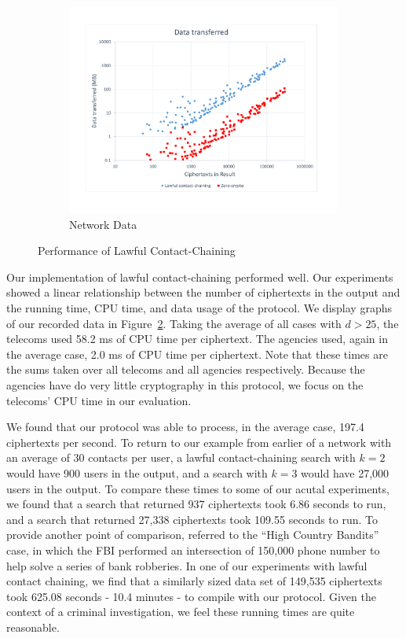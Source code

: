 \begin{figure}[t]
\begin{subfigure}{.33\textwidth}
\centering
\includegraphics[width=0.99\textwidth]{bandwidth.pdf}
\captionsetup{justification=centering}
\caption{Network Data}
\label{fig:data}
\end{subfigure}
\caption{Performance of Lawful Contact-Chaining}
\label{fig:performance}
\end{figure}



Our implementation of lawful contact-chaining performed well. Our experiments showed a linear relationship between the number of ciphertexts in the output and the running time, CPU time, and data usage of the protocol. We display graphs of our recorded data in Figure~\ref{fig:performance}. Taking the average of all cases with $d>25$, the telecoms used 58.2 ms of CPU time per ciphertext. The agencies used, again in the average case, 2.0 ms of CPU time per ciphertext. Note that these times are the sums taken over all telecoms and all agencies respectively. Because the agencies have do very little cryptography in this protocol, we focus on the telecoms' CPU time in our evaluation. 

We found that our protocol was able to process, in the average case, 197.4 ciphertexts per second. To return to our example from earlier of a network with an average of 30 contacts per user, a lawful contact-chaining search with $k=2$ would have 900 users in the output, and a search with $k=3$ would have 27,000 users in the output. To compare these times to some of our acutal experiments, we found that a search that returned 937 ciphertexts took 6.86 seconds to run, and a search that returned 27,338 ciphertexts took 109.55 seconds to run. To provide another point of comparison, \cite{sff-foci2014} referred to the ``High Country Bandits'' case, in which the FBI performed an intersection of 150,000 phone number to help solve a series of bank robberies. In one of our experiments with lawful contact chaining, we find that a similarly sized data set of 149,535 ciphertexts took 625.08 seconds - 10.4 minutes - to compile with our protocol. Given the context of a criminal investigation, we feel these running times are quite reasonable. 

